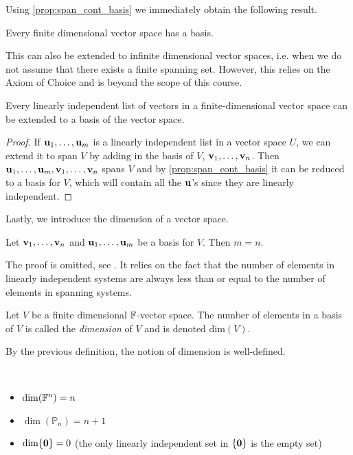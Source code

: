 \documentclass{article}
\begin{document}
Using \cref{prop:span_cont_basis} we immediately obtain the following result.

\begin{corollary}
Every finite dimensional vector space has a basis.
\end{corollary}

This can also be extended to infinite dimensional vector spaces, i.e. when we do not assume that there exists a finite spanning set. However, this relies on the Axiom of Choice and is beyond the scope of this course.

\begin{proposition}
\label{prop:extendlisttobasis}
Every linearly independent list of vectors in a finite-dimensional vector space can be extended to a basis of the vector space.
\end{proposition}
\begin{proof}
If ${\mathbf{u}}_1, \ldots, {\mathbf{u}}_m$ is a linearly independent list in a vector space $U$, we can extend it to span $V$ by adding in the basis of $V$, ${\mathbf{v}}_1, \ldots, {\mathbf{v}}_n$. Then ${\mathbf{u}}_1, \ldots, {\mathbf{u}}_m,{\mathbf{v}}_1, \ldots, {\mathbf{v}}_n$ spans $V$ and by \cref{prop:span_cont_basis} it can be reduced to a basis for $V$, which will contain all the ${\mathbf{u}}$'s since they are linearly independent.
\end{proof}

Lastly, we introduce the dimension of a vector space.

\begin{proposition}
Let ${\mathbf{v}}_1,\ldots, {\mathbf{v}}_n$ and ${\mathbf{u}}_1,\ldots, {\mathbf{u}}_m$ be a basis for $V$. Then $m=n$.
\end{proposition}

The proof is omitted, see \cite[Chapter 2, Proposition 2.35]{linalgright}. It relies on the fact that the number of elements in linearly independent systems are always less than or equal to the number of elements in spanning systems. 

\begin{definition}
Let $V$ be a finite dimensional ${\mathbb{F}}$-vector space. The number of elements in a basis of $V$ is called the \emph{dimension} of $V$ and is denoted $\mathrm{dim}(V)$.
\end{definition}

By the previous definition, the notion of dimension is well-defined. 

\begin{example}
\textcolor{white}{skip}
\begin{itemize}
    \item $\dim({\mathbb{F}}^n) = n$
    \item $\dim(\mathbb{P}_n)= n+1$
    \item $\dim \{ {\mathbf{0}} \} = 0$ (the only linearly independent set in $\{ {\mathbf{0}} \}$ is the empty set)
\end{itemize}
\end{example}
\end{document}
